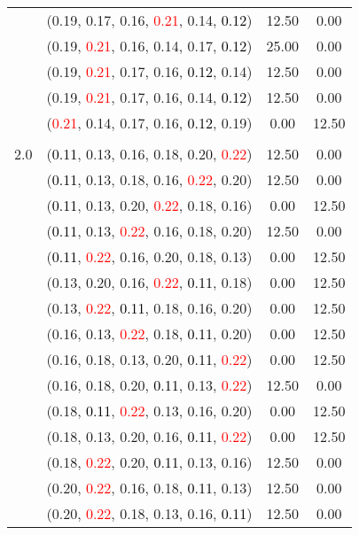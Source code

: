 \documentclass[10pt,a4paper]{report}
\begin{document}
\begin{center}
\begin{longtable}{clcc}
			&(0.19, 0.17, 0.16, \textcolor{red}{0.21}, 0.14, \textcolor{black}{0.12})&12.50&0.00\\
			&(0.19, \textcolor{red}{0.21}, 0.16, 0.14, 0.17, \textcolor{black}{0.12})&25.00&0.00\\
			&(0.19, \textcolor{red}{0.21}, 0.17, 0.16, \textcolor{black}{0.12}, 0.14)&12.50&0.00\\
			&(0.19, \textcolor{red}{0.21}, 0.17, 0.16, 0.14, \textcolor{black}{0.12})&12.50&0.00\\
			&(\textcolor{red}{0.21}, 0.14, 0.17, 0.16, \textcolor{black}{0.12}, 0.19)&0.00&12.50\\
		&&&\\
		2.0			&(\textcolor{black}{0.11}, 0.13, 0.16, 0.18, 0.20, \textcolor{red}{0.22})&12.50&0.00\\
			&(\textcolor{black}{0.11}, 0.13, 0.18, 0.16, \textcolor{red}{0.22}, 0.20)&12.50&0.00\\
			&(\textcolor{black}{0.11}, 0.13, 0.20, \textcolor{red}{0.22}, 0.18, 0.16)&0.00&12.50\\
			&(\textcolor{black}{0.11}, 0.13, \textcolor{red}{0.22}, 0.16, 0.18, 0.20)&12.50&0.00\\
			&(\textcolor{black}{0.11}, \textcolor{red}{0.22}, 0.16, 0.20, 0.18, 0.13)&0.00&12.50\\
			&(0.13, 0.20, 0.16, \textcolor{red}{0.22}, \textcolor{black}{0.11}, 0.18)&0.00&12.50\\
			&(0.13, \textcolor{red}{0.22}, \textcolor{black}{0.11}, 0.18, 0.16, 0.20)&0.00&12.50\\
			&(0.16, 0.13, \textcolor{red}{0.22}, 0.18, \textcolor{black}{0.11}, 0.20)&0.00&12.50\\
			&(0.16, 0.18, 0.13, 0.20, \textcolor{black}{0.11}, \textcolor{red}{0.22})&0.00&12.50\\
			&(0.16, 0.18, 0.20, \textcolor{black}{0.11}, 0.13, \textcolor{red}{0.22})&12.50&0.00\\
			&(0.18, \textcolor{black}{0.11}, \textcolor{red}{0.22}, 0.13, 0.16, 0.20)&0.00&12.50\\
			&(0.18, 0.13, 0.20, 0.16, \textcolor{black}{0.11}, \textcolor{red}{0.22})&0.00&12.50\\
			&(0.18, \textcolor{red}{0.22}, 0.20, \textcolor{black}{0.11}, 0.13, 0.16)&12.50&0.00\\
			&(0.20, \textcolor{red}{0.22}, 0.16, 0.18, \textcolor{black}{0.11}, 0.13)&12.50&0.00\\
			&(0.20, \textcolor{red}{0.22}, 0.18, 0.13, 0.16, \textcolor{black}{0.11})&12.50&0.00\\

\end{longtable}
\end{center}
\end{document}
